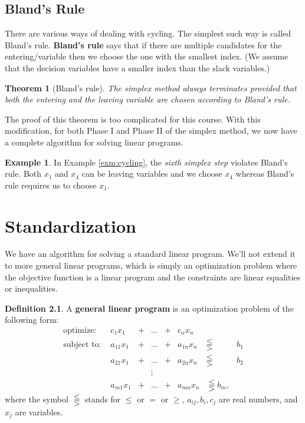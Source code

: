 \documentclass[
]{book}
\newtheorem{theorem}{Theorem}[chapter]
\theoremstyle{definition}
\newtheorem{definition}{Definition}[chapter]
\theoremstyle{definition}
\newtheorem{example}{Example}[chapter]
\theoremstyle{definition}
\theoremstyle{definition}
\theoremstyle{remark}
\begin{document}
\hypertarget{blands-rule}{%
\section{Bland's Rule}\label{blands-rule}}

There are various ways of dealing with cycling.
The simplest such way is called Bland's rule.
\textbf{Bland's rule} says that if there are multiple candidates for the entering/variable then we choose the one with the smallest index. (We assume that the decision variables have a smaller index than the slack variables.)

\begin{theorem}[Bland's rule]
The simplex method always terminates provided that both the
entering and the leaving variable are chosen according to Bland's rule.
\end{theorem}

The proof of this theorem is too complicated for this course. With this modification, for both Phase I and Phase II of the simplex method, we now have a complete algorithm for solving linear programs.

\begin{example}
In Example \ref{exm:cycling}, the \emph{sixth simplex step} violates Bland's rule. Both \(x_1\) and \(x_4\) can be leaving variables and we choose \(x_4\) whereas Bland's rule requires us to choose \(x_1\).
\end{example}

\hypertarget{standardization}{%
\chapter{Standardization}\label{standardization}}

We have an algorithm for solving a standard linear program.
We'll not extend it to more general linear programs, which is simply an optimization problem where the objective function is a linear program and the constraints are linear equalities or inequalities.

\begin{definition}
A \textbf{general linear program} is an optimization problem of the following form:
\begin{equation}
  \begin{array}{llllllll}
    \mbox{optimize: } 
      & c_1 x_1 & + & \dots & + & c_n x_n & \\
    \mbox{subject to: } 
      & a_{11} x_1 & + & \dots & + & a_{1n} x_n & \lesseqqgtr & b_1 \\
      & a_{21} x_1 & + & \dots & + & a_{2n} x_n & \lesseqqgtr & b_2 \\
      & & & \vdots &  \\
      & a_{m1} x_1 & + & \dots & + & a_{mn} x_n & \lesseqqgtr b_m,
  \end{array}
  \label{eq:intro-lp}
\end{equation}
where the symbol \(\lesseqqgtr\) stands for \(\leq\) or \(=\) or \(\geq\), \(a_{ij}, b_i, c_j\) are real numbers, and \(x_j\) are variables.
\end{definition}
\end{document}
